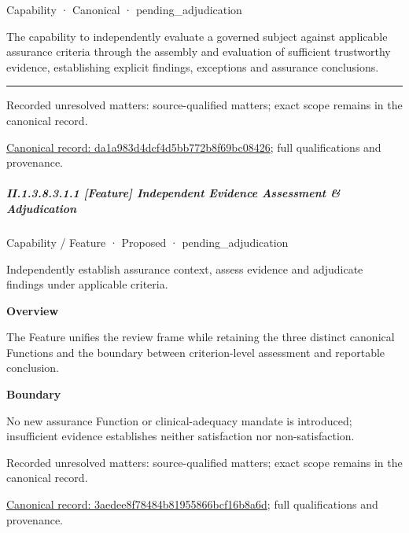 \label{element:da1a983d4dcf4d5bb772b8f69bc08426}
{\small Capability · Canonical · pending\_adjudication}\par

The capability to independently evaluate a governed subject against applicable assurance criteria through the assembly and evaluation of sufficient trustworthy evidence, establishing explicit findings, exceptions and assurance conclusions.



\medskip\hrule\medskip

{\small Recorded unresolved matters: source-qualified matters; exact scope remains in the canonical record.}\par
{\footnotesize \href{../../../../../../../continuum/strategy/capability/da1a983d4dcf4d5bb772b8f69bc08426.md}{Canonical record: da1a983d4dcf4d5bb772b8f69bc08426}; full qualifications and provenance.}\par
\subparagraph*{II.1.3.8.3.1.1 [Feature] Independent Evidence Assessment \& Adjudication}
\label{navigation:II.1.3.8.3.1.1}

\label{element:3aedee8f78484b81955866bcf16b8a6d}
{\small Capability / Feature · Proposed · pending\_adjudication}\par

Independently establish assurance context, assess evidence and adjudicate findings under applicable criteria.



\textbf{Overview}



The Feature unifies the review frame while retaining the three distinct canonical Functions and the boundary between criterion-level assessment and reportable conclusion.



\textbf{Boundary}



No new assurance Function or clinical-adequacy mandate is introduced; insufficient evidence establishes neither satisfaction nor non-satisfaction.


{\small Recorded unresolved matters: source-qualified matters; exact scope remains in the canonical record.}\par
{\footnotesize \href{../../../../../../../continuum/strategy/capability/feature/3aedee8f78484b81955866bcf16b8a6d.md}{Canonical record: 3aedee8f78484b81955866bcf16b8a6d}; full qualifications and provenance.}\par
